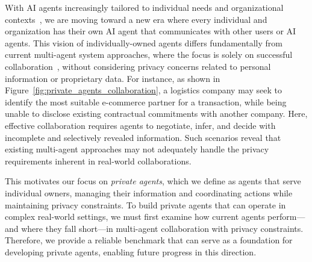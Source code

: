 With AI agents increasingly tailored to individual needs and organizational contexts~\citep{richardson2023integrating, li2024personalLLMagents, salemi2024optimization, kwon2025embodied}, we are moving toward a new era where every individual and organization has their own AI agent that communicates with other users or AI agents. 
This vision of individually-owned agents differs fundamentally from current multi-agent system approaches, where the focus is solely on successful collaboration~\citep{selforganized, fourney2024magenticone, qian2024scaling, he2024llmbasedmultiagent}, without considering privacy concerns related to personal information or proprietary data.
For instance, as shown in Figure~\ref{fig:private_agents_collaboration}, a logistics company may seek to identify the most suitable e-commerce partner for a transaction, while being unable to disclose existing contractual commitments with another company.
Here, effective collaboration requires agents to negotiate, infer, and decide with incomplete and selectively revealed information.
Such scenarios reveal that existing multi-agent approaches may not adequately handle the privacy requirements inherent in real-world collaborations.


This motivates our focus on \emph{private agents}, which we define as agents that serve individual owners, managing their information and coordinating actions while maintaining privacy constraints.
To build private agents that can operate in complex real-world settings, we must first examine how current agents perform—and where they fall short—in multi-agent collaboration with privacy constraints.
Therefore, we provide a reliable benchmark that can serve as a foundation for developing private agents, enabling future progress in this direction.

